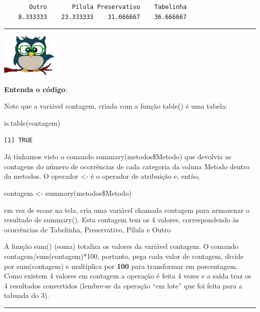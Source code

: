 \documentclass[
]{article}
\newenvironment{Shaded}{\begin{snugshade}}{\end{snugshade}}
\newcommand{\FunctionTok}[1]{\textcolor[rgb]{0.00,0.00,0.00}{#1}}
\newcommand{\NormalTok}[1]{#1}
\begin{document}
\begin{verbatim}
       Outro       Pílula Preservativo    Tabelinha 
    8.333333    23.333333    31.666667    36.666667 
\end{verbatim}

\begin{center}\rule{0.5\linewidth}{0.5pt}\end{center}

\begin{flushleft}\includegraphics[width=0.08\linewidth]{coruja} \end{flushleft}

\textbf{Entenda o código}:

Note que a variável contagem, criada com a função table() é uma tabela:

\begin{Shaded}
\begin{Highlighting}[]
\FunctionTok{is.table}\NormalTok{(contagem)}
\end{Highlighting}
\end{Shaded}

\begin{verbatim}
[1] TRUE
\end{verbatim}

Já tínhamos visto o comando summary(metodos\$Metodo) que devolvia as
contagens do número de ocorrências de cada categoria da coluna Metodo
dentro da metodos. O operador \textless- é o operador de atribuição e,
então,

contagem \textless- summary(metodos\$Metodo)

em vez de ecoar na tela, cria uma variável chamada contagem para
armazenar o resultado de summary(). Esta contagem tem os 4 valores,
correspondendo às ocorrências de Tabelinha, Preservativo, Pílula e Outro

A função sum() (soma) totaliza os valores da variável contagem. O
comando contagem/sum(contagem)*100, portanto, pega cada valor de
contagem, divide por sum(contagem) e multiplica por \textbf{100} para
transformar em porcentagem. Como existem 4 valores em contagem a
operação é feita 4 vezes e a saída traz os 4 resultados convertidos
(lembre-se da operação ``em lote'' que foi feita para a tabuada do 3).

\begin{center}\rule{0.5\linewidth}{0.5pt}\end{center}
\end{document}
